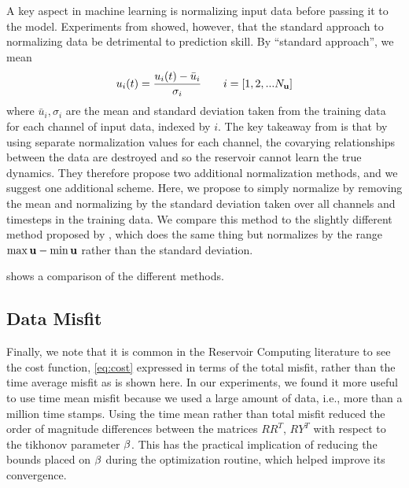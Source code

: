 A key aspect in machine learning is normalizing input data before passing it to
the model.
Experiments from \citet{platt_systematic_2022} showed, however, that the
standard approach to normalizing data
be detrimental to prediction skill.
By ``standard  approach'', we mean
\begin{equation*}
    u_i(t) = \dfrac{u_i(t) - \bar{u}_i}{\sigma_i} \qquad i = [1, 2, ...
    N_{\mathbf{u}}]
\end{equation*} 
where $\bar{u}_i, \sigma_i$ are the mean and standard deviation taken from the
training data for each channel
of input data, indexed by $i$.
The key takeaway from \citet{platt_systematic_2022} is that by using separate
normalization values for each channel, the covarying relationships between the
data are destroyed and so the reservoir cannot learn the true dynamics.
They therefore propose two additional normalization methods, and we suggest one
additional scheme.
Here, we propose to simply normalize by removing the mean and normalizing by the
standard deviation taken over all channels and timesteps in the training data.
We compare this method to the slightly different method proposed by
\citet{platt_systematic_2022}, which does the same thing but normalizes by the
range $\max{\mathbf{u}} - \min{\mathbf{u}}$ rather than the standard
deviation.

 shows a comparison of the different methods.

\subsection{Data Misfit}
\label{subsec:data_misfit}

Finally, we note that it is common in the Reservoir Computing literature to see
the cost function, \cref{eq:cost} expressed in terms of the total misfit, rather
than the time average misfit as is shown here.
In our experiments, we found it more useful to use time mean misfit
because we used a large amount of data, i.e., more than a million time stamps.
Using the time mean rather than total misfit reduced the order of magnitude
differences between the matrices $RR^T$, $RY^T$ with respect to the tikhonov
parameter $\beta$.
This has the practical implication of reducing the bounds placed on $\beta$
during the optimization routine, which helped improve its convergence.





